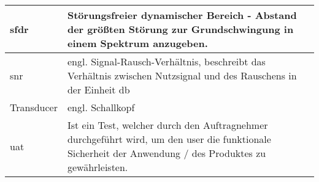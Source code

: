 \begin{longtable}{|p{5.5cm}|p{9.5cm}|}
\acf{sfdr} & Störungsfreier dynamischer Bereich - Abstand der größten Störung zur Grundschwingung in einem Spektrum anzugeben.\\ \hline
\acf{snr} & engl. Signal-Rausch-Verhältnis, beschreibt das Verhältnis zwischen Nutzsignal und des Rauschens in der Einheit \ac{db}\\ \hline
Transducer & engl. Schallkopf \\ \hline
\acf{uat} & Ist ein Test, welcher durch den Auftragnehmer durchgeführt wird, um den user die funktionale Sicherheit der Anwendung / des Produktes zu gewährleisten. \\ \hline
\end{longtable}